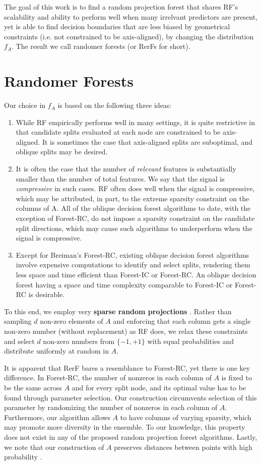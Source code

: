 \documentclass[10pt]{article}
\begin{document}
The goal of this work is to find a random projection forest that shares RF's scalability and ability to perform well when many irrelvant predictors are present, yet is able to find decision boundaries that are less biased by geometrical constraints (i.e. not constrained to be axis-aligned), by changing the distribution $f_A$. The result we call randomer forests (or RerFs for short).

\section{Randomer Forests}

Our choice in $f_A$ is based on the following three ideas:
\begin{enumerate}
  \item While RF empirically performs well in many settings, it is quite restrictive in that candidate splits evaluated at each node are constrained to be axis-aligned. It is sometimes the case that axis-aligned splits are suboptimal, and oblique splits may be desired.
  \item It is often the case that the number of \textit{relevant} features is substantially smaller than the number of total features. We say that the signal is \textit{compressive} in such cases. RF often does well when the signal is compressive, which may be attributed, in part, to the extreme sparsity constraint on the columns of A. All of the oblique decision forest algorithms to date, with the exception of Forest-RC, do not impose a sparsity constraint on the candidate split directions, which may cause such algorithms to underperform when the signal is compressive.
  \item Except for Breiman's Forest-RC, existing oblique decision forest algorithms involve expensive computations to identify and select splits, rendering them less space and time efficient than Forest-IC or Forest-RC. An oblique decision forest having a space and time complexity comparable to Forest-IC or Forest-RC is desirable.
\end{enumerate}

To this end, we employ very {\bf{sparse random projections}} \cite{Li2006}. Rather than sampling $d$ non-zero elements of $A$ and enforcing that each column gets a single non-zero number (without replacement) as RF does, we relax these constraints and select $d$ non-zero numbers from $\{-1,+1\}$ with equal probabilities and distribute uniformly at random in $A$.

It is apparent that RerF bares a resemblance to Forest-RC, yet there is one key difference. In Forest-RC, the number of nonzeros in each column of $A$ is fixed to be the same across $A$ and for every split node, and its optimal value has to be found through parameter selection. Our construction circumvents selection of this parameter by randomizing the number of nonzeros in each column of $A$. Furthermore, our algorithm allows $A$ to have columns of varying sparsity, which may promote more diversity in the ensemble. To our knowledge, this property does not exist in any of the proposed random projection forest algorithms. Lastly, we note that our construction of $A$ preserves distances between points with high probability \cite{Li2006}.
\end{document}
